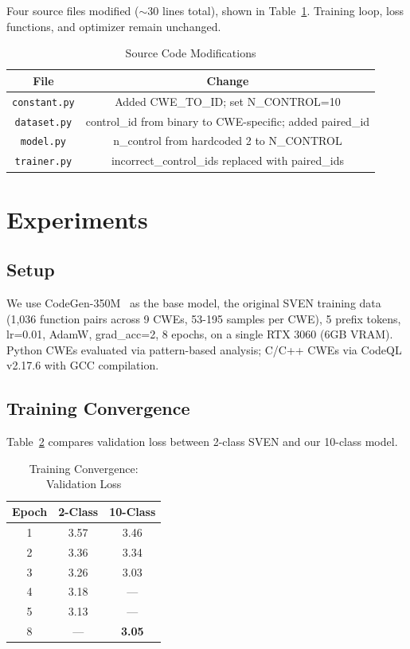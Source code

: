 \documentclass[conference]{IEEEtran}
\begin{document}
Four source files modified ($\sim$30 lines total), shown in Table~\ref{tab:changes}. Training loop, loss functions, and optimizer remain unchanged.

\begin{table}[h]
\centering
\caption{Source Code Modifications}
\label{tab:changes}
\begin{tabular}{c|c}
\toprule
\textbf{File} & \textbf{Change} \\
\midrule
\texttt{constant.py} & Added CWE\_TO\_ID; set N\_CONTROL=10 \\
\texttt{dataset.py} & control\_id from binary to CWE-specific; added paired\_id \\
\texttt{model.py} & n\_control from hardcoded 2 to N\_CONTROL \\
\texttt{trainer.py} & incorrect\_control\_ids replaced with paired\_ids \\
\bottomrule
\end{tabular}
\end{table}

\section{Experiments}

\subsection{Setup}

We use CodeGen-350M~\cite{nijkamp2022codegen} as the base model, the original SVEN training data (1,036 function pairs across 9 CWEs, 53-195 samples per CWE), 5 prefix tokens, lr=0.01, AdamW, grad\_acc=2, 8 epochs, on a single RTX 3060 (6GB VRAM). Python CWEs evaluated via pattern-based analysis; C/C++ CWEs via CodeQL v2.17.6 with GCC compilation.

\subsection{Training Convergence}

Table~\ref{tab:convergence} compares validation loss between 2-class SVEN and our 10-class model.

\begin{table}[h]
\centering
\caption{Training Convergence: Validation Loss}
\label{tab:convergence}
\begin{tabular}{c|c|c}
\toprule
\textbf{Epoch} & \textbf{2-Class} & \textbf{10-Class} \\
\midrule
1 & 3.57 & 3.46 \\
2 & 3.36 & 3.34 \\
3 & 3.26 & 3.03 \\
4 & 3.18 & --- \\
5 & 3.13 & --- \\
8 & --- & \textbf{3.05} \\
\bottomrule
\end{tabular}
\end{table}
\end{document}
